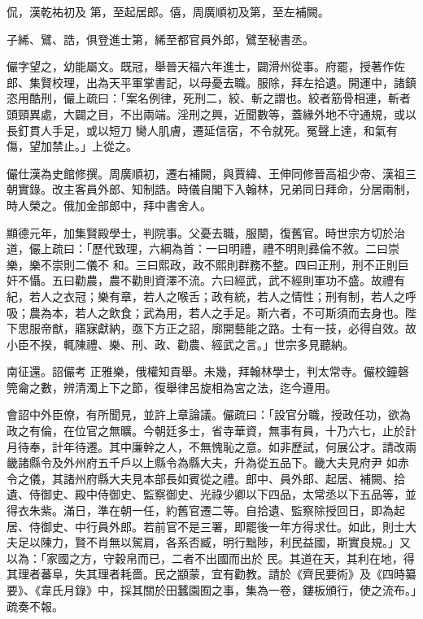 \begin{pinyinscope}
 侃，漢乾祐初及
 第，至起居郎。僖，周廣順初及第，至左補闕。



 子絺、鷿、誥，俱登進士第，絺至都官員外郎，鷿至秘書丞。



 儼字望之，幼能屬文。既冠，舉晉天福六年進士，闢滑州從事。府罷，授著作佐郎、集賢校理，出為天平軍掌書記，以母憂去職。服除，拜左拾遺。開運中，諸鎮恣用酷刑，儼上疏曰：「案名例律，死刑二，絞、斬之謂也。絞者筋骨相連，斬者頭頸異處，大闢之目，不出兩端。淫刑之興，近聞數等，蓋緣外地不守通規，或以長釘貫人手足，或以短刀
 臠人肌膚，遷延信宿，不令就死。冤聲上達，和氣有傷，望加禁止。」上從之。



 儼仕漢為史館修撰。周廣順初，遷右補闕，與賈緯、王伸同修晉高祖少帝、漢祖三朝實錄。改主客員外郎、知制誥。時儀自閣下入翰林，兄弟同日拜命，分居兩制，時人榮之。俄加金部郎中，拜中書舍人。



 顯德元年，加集賢殿學士，判院事。父憂去職，服闋，復舊官。時世宗方切於治道，儼上疏曰：「歷代致理，六綱為首：一曰明禮，禮不明則彞倫不敘。二曰崇樂，樂不崇則二儀不
 和。三曰熙政，政不熙則群務不整。四曰正刑，刑不正則巨奸不懾。五曰勸農，農不勸則資澤不流。六曰經武，武不經則軍功不盛。故禮有紀，若人之衣冠；樂有章，若人之喉舌；政有統，若人之情性；刑有制，若人之呼吸；農為本，若人之飲食；武為用，若人之手足。斯六者，不可斯須而去身也。陛下思服帝猷，寤寐獻納，亟下方正之詔，廓開藝能之路。士有一技，必得自效。故小臣不揆，輒陳禮、樂、刑、政、勸農、經武之言。」世宗多見聽納。



 南征還。詔儼考
 正雅樂，俄權知貢舉。未幾，拜翰林學士，判太常寺。儼校鐘磬筦龠之數，辨清濁上下之節，復舉律呂旋相為宮之法，迄今遵用。



 會詔中外臣僚，有所聞見，並許上章論議。儼疏曰：「設官分職，授政任功，欲為政之有倫，在位官之無曠。今朝廷多士，省寺華資，無事有員，十乃六七，止於計月待奉，計年待遷。其中廉幹之人，不無愧恥之意。如非歷試，何展公才。請改兩畿諸縣令及外州府五千戶以上縣令為縣大夫，升為從五品下。畿大夫見府尹
 如赤令之儀，其諸州府縣大夫見本部長如賓從之禮。郎中、員外郎、起居、補闕、拾遺、侍御史、殿中侍御史、監察御史、光祿少卿以下四品，太常丞以下五品等，並得衣朱紫。滿日，準在朝一任，約舊官遷二等。自拾遺、監察除授回日，即為起居、侍御史、中行員外郎。若前官不是三署，即罷後一年方得求仕。如此，則士大夫足以陳力，賢不肖無以駕肩，各系否臧，明行黜陟，利民益國，斯實良規。」又以為：「家國之方，守穀帛而已，二者不出國而出於
 民。其道在天，其利在地，得其理者蕃阜，失其理者耗嗇。民之顓蒙，宜有勸教。請於《齊民要術》及《四時纂要》、《韋氏月錄》中，採其關於田蠶園囿之事，集為一卷，鏤板頒行，使之流布。」疏奏不報。




\end{pinyinscope}
